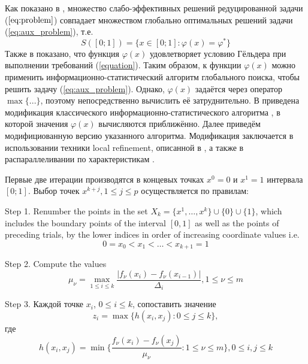 \documentclass{llncs}
\begin{document}
Как показано в \cite{}, множество слабо-эффективных решений редуцированной задачи (\(\ref{eq:problem}\)) совпадает множеством глобально оптимальных решений задачи (\ref{eq:aux_problem}), т.е.
\begin{equation}
  \label{eq:s}
  S([0;1])=\{x\in [0;1]:\varphi(x)=\varphi^*\}
\end{equation}
Также в \cite{} показано, что функция \(\varphi(x)\) удовлетворяет условию Гёльдера при выполнении требований (\ref{equation}). Таким образом, к функции \(\varphi(x)\) можно применить информационно-статистический алгоритм глобального поиска, чтобы решить задачу (\ref{eq:aux_problem}). Однако, \(\varphi(x)\) задаётся через оператор \(\max\{...\}\), поэтому непосредственно вычислить её затруднительно. В \cite{} приведена модификация классического информационно-статистического алгоритма \cite{}, в которой значения \(\varphi(x)\) вычисляются приближённо. Далее приведём модифициованную версию указанного алгоритма. Модификация заключается в использовании техники local refinement, описанной в \cite{}, а также в распараллеливании по характеристикам \cite{}.

Первые две итерации производятся в концевых точках \(x^0=0\) и \(x^1=1\) интервала \([0;1]\). Выбор точек \(x^{k+j}, 1\leqslant j\leqslant p\) осуществляется по правилам:

Step 1. Renumber the points in the set \(X_k=\{x^1,\dotsc,x^k\}\cup\{0\}\cup\{1\}\), which includes the boundary points of the interval \([0,1]\) as well as the points of preceding trials, by the lower indices in order of increasing coordinate values  i.e.
\begin{displaymath}
  0=x_0<x_1<\dotsc<x_{k+1}=1
\end{displaymath}

Step 2. Compute the values
\begin{equation}
\label{step2}
\mu_\nu=\max_{1\leqslant i\leqslant k}\dfrac{|f_\nu(x_i)-f_\nu(x_{i-1})|}{\Delta_i}, 1\leqslant \nu\leqslant m
\end{equation}

Step 3. Каждой точке \(x_i\), \(0\leqslant i\leqslant k\), сопоставить значение
\begin{equation}
  z_i=\max\{h(x_i,x_j):0\leqslant j\leqslant k\},
\end{equation}
где
\begin{equation}
  h(x_i,x_j)=\min\{\frac{f_\nu(x_i)-f_\nu(x_j)}{\mu_\nu}:1\leqslant \nu\leqslant m\}, 0\leqslant i,j\leqslant k
\end{equation}
\end{document}
